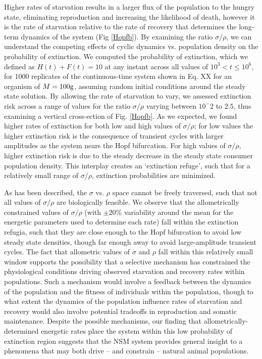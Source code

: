 \documentclass{pnastwo}
\begin{document}
\begin{article}
Higher rates of starvation results in a larger flux of the population to the hungry state, eliminating reproduction and increasing the likelihood of death, however it is the rate of starvation relative to the rate of recovery that determines the long-term dynamics of the system (Fig \ref{Hopfb}).
By examining the ratio $\sigma/\rho$, we can understand the competing effects of cyclic dynamics vs. population density on the probability of extinction.
We computed the probability of extinction, which we defined as $H(t)+F(t)=10$ at any instant across all values of $10^3<t\leq 10^6$, for 1000 replicates of the continuous-time system shown in Eq. XX for an organism of $M=100{\rm g}$, assuming random initial conditions around the steady state solution. %
By allowing the rate of starvation to vary, we assessed extinction risk across a range of values for the ratio $\sigma/\rho$ varying between $10^-2$ to $2.5$, thus examining a vertical cross-ection of Fig. \ref{Hopfb}.
As we expected, we found higher rates of extinction for both low and high values of $\sigma/\rho$; for low values the higher extinction risk is the consequence of transient cycles with larger amplitudes as the system nears the Hopf bifurcation.
For high values of $\sigma/\rho$, higher extinction risk is due to the steady decrease in the steady state consumer population density.
This interplay creates an `extinction refuge', such that for a relatively small range of $\sigma/\rho$, extinction probabilities are minimized.

As has been described, the $\sigma$ vs. $\rho$ space cannot be freely traversed, such that not all values of $\sigma/\rho$ are biologically feasible.
We observe that the allometrically constrained values of $\sigma/\rho$ (with $\pm 20\%$ variability around the mean for the energetic parameters used to determine each rate) fall within the extinction refugia, such that they are close enough to the Hopf bifurcation to avoid low steady state densities, though far enough away to avoid large-amplitude transient cycles.
The fact that allometric values of $\sigma$ and $\rho$ fall within this relatively small window supports the possibility that a selective mechanism has constrained the physiological conditions driving observed starvation and recovery rates within populations.
Such a mechanism would involve a feedback between the dynamics of the population and the fitness of individuals within the population, though to what extent the dynamics of the population influence rates of starvation and recovery would also involve potential tradeoffs in reproduction and somatic maintenance.
Despite the possible mechanisms, our finding that allometrically-determined energetic rates place the system within this low probability of extinction region suggests that the NSM system provides general insight to a phenomena that may both drive -- and constrain -- natural animal populations.




\end{article}
\end{document}
